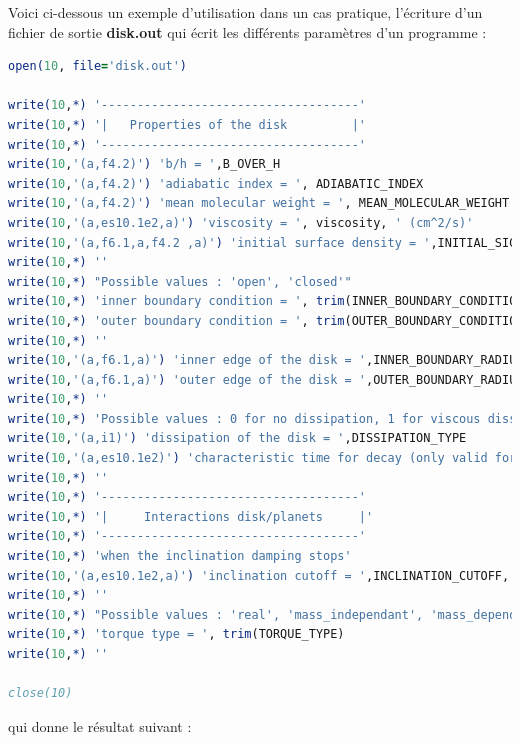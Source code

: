 \documentclass[a4paper,twoside]{article}
\begin{document}
Voici ci-dessous un exemple d'utilisation dans un cas pratique, l'écriture d'un fichier de sortie \textbf{disk.out} qui écrit les différents paramètres d'un programme : 
\begin{lstlisting}[language=Fortran]
open(10, file='disk.out')

write(10,*) '------------------------------------'
write(10,*) '|   Properties of the disk         |'
write(10,*) '------------------------------------'
write(10,'(a,f4.2)') 'b/h = ',B_OVER_H
write(10,'(a,f4.2)') 'adiabatic index = ', ADIABATIC_INDEX
write(10,'(a,f4.2)') 'mean molecular weight = ', MEAN_MOLECULAR_WEIGHT
write(10,'(a,es10.1e2,a)') 'viscosity = ', viscosity, ' (cm^2/s)'
write(10,'(a,f6.1,a,f4.2 ,a)') 'initial surface density = ',INITIAL_SIGMA_0, ' * R^(-',INITIAL_SIGMA_INDEX,') (g/cm^2)'
write(10,*) ''
write(10,*) "Possible values : 'open', 'closed'"
write(10,*) 'inner boundary condition = ', trim(INNER_BOUNDARY_CONDITION)
write(10,*) 'outer boundary condition = ', trim(OUTER_BOUNDARY_CONDITION)
write(10,*) ''
write(10,'(a,f6.1,a)') 'inner edge of the disk = ',INNER_BOUNDARY_RADIUS, ' (AU)'
write(10,'(a,f6.1,a)') 'outer edge of the disk = ',OUTER_BOUNDARY_RADIUS, ' (AU)'
write(10,*) ''
write(10,*) 'Possible values : 0 for no dissipation, 1 for viscous dissipation and 2 for exponential decay of the initial profile'
write(10,'(a,i1)') 'dissipation of the disk = ',DISSIPATION_TYPE
write(10,'(a,es10.1e2)') 'characteristic time for decay (only valid for exponential decay) = ',TAU_DISSIPATION
write(10,*) ''
write(10,*) '------------------------------------'
write(10,*) '|     Interactions disk/planets     |'
write(10,*) '------------------------------------'
write(10,*) 'when the inclination damping stops'
write(10,'(a,es10.1e2,a)') 'inclination cutoff = ',INCLINATION_CUTOFF, ' (rad)'
write(10,*) ''
write(10,*) "Possible values : 'real', 'mass_independant', 'mass_dependant'"
write(10,*) 'torque type = ', trim(TORQUE_TYPE)
write(10,*) ''

close(10)
\end{lstlisting}
qui donne le résultat suivant :
\end{document}
